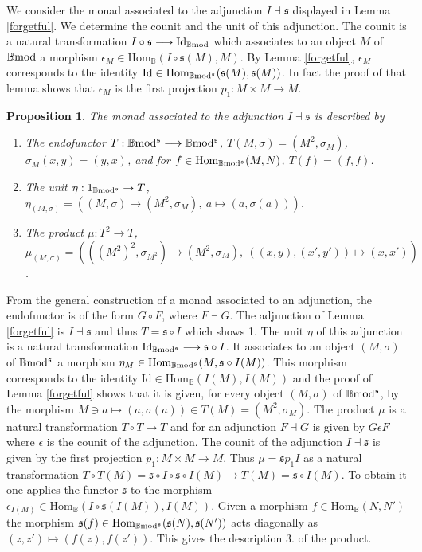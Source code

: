 \documentclass[12pt]{article}
\newtheorem{prop}[thm]{Proposition}
\def\Hom{{\rm Hom}}
\def\id{{\rm id}}
\def\B{{\mathbb B}}
\def\id{{\mbox{Id}}}
\def\Hom {{\mbox{Hom}}}
\def\yb{\mathfrak{s}}
\def\bmod{{\rm \B mod}}
\def\b2{{\rm \B mod^{\mathfrak s}}}
\begin{document}
We consider the monad associated to the adjunction $I\dashv \yb$ displayed in Lemma \ref{forgetful}. We determine the counit and the unit of this adjunction. The counit is a natural transformation $I\circ \yb\longrightarrow\id_\bmod$ which associates to an object $M$ of $\bmod$ a morphism $\epsilon_M\in \Hom_\B(I\circ \yb(M),M)$. By Lemma \ref{forgetful}, $\epsilon_M$ corresponds to the identity $\id\in \Hom_\b2(\yb(M),\yb(M))$. In fact the proof of that lemma shows that $\epsilon_M$ is the first projection $p_1:M\times M\to M$. 
\begin{prop}\label{monad} The monad associated to the adjunction $I\dashv \yb$ is described by 
\begin{enumerate}
	\item The endofunctor $T:\b2\longrightarrow \b2$,  $T(M,\sigma)=(M^2,\sigma_M)$, $\sigma_M(x,y)=(y,x)$, and for $f\in \Hom_\b2(M,N)$, $T(f)=(f,f)$.
	\item The unit $\eta: 1_\b2\to T$,  $\eta_{(M,\sigma)}=((M,\sigma)\to (M^2,\sigma_M),~  a\mapsto (a,\sigma(a)))$.
	\item The product $\mu:T^2\to T$, $\mu_{(M,\sigma)}= (((M^2)^2,\sigma_{M^2})\to (M^2,\sigma_M),~((x,y),(x',y'))\mapsto (x,x'))$. 
\end{enumerate}	
\end{prop}
\proof From the general construction of a monad associated to an adjunction, the endofunctor is of the form $G\circ F$, where $F\dashv G$. The adjunction of Lemma \ref{forgetful} is $I \dashv \yb$ and thus $T=\yb\circ I$ which shows 1. The unit $\eta$ of this adjunction is a natural transformation $\id_\b2\longrightarrow \yb \circ I$. It associates to an object $(M,\sigma)$ of $\b2$ a morphism $\eta_M\in \Hom_\b2(M,\yb \circ I(M))$. This morphism  corresponds to the identity $\id\in \Hom_\B(I(M),I(M))$ and the proof of Lemma \ref{forgetful} shows that it is given, for every object $(M,\sigma)$ of $\b2$, by the morphism
$
M \ni a\mapsto (a,\sigma(a))\in T(M)=(M^2,\sigma_M)
$.
The product $\mu$ is a natural transformation  $T\circ T\longrightarrow T$ and for an adjunction $F\dashv G$ is given by $G\epsilon F$ where $\epsilon$ is the counit of the adjunction. The counit of the adjunction $I \dashv \yb$ is given by the first projection $p_1:M\times M\to M$. Thus $\mu=\yb p_1 I$ as a natural transformation $T\circ T(M)=\yb\circ I\circ \yb\circ I(M)\to  T(M)=\yb\circ I(M)$. To obtain it one applies the functor $\yb$  to the morphism $\epsilon_{I(M)}\in \Hom_\B(I\circ \yb(I(M)),I(M))$. Given a morphism $f\in \Hom_\B(N,N')$ the morphism $\yb(f)\in \Hom_\b2(\yb(N),\yb(N'))$ acts diagonally as $(z,z')\mapsto (f(z),f(z'))$. This gives the description 3. of the product. \endproof 
\end{document}
